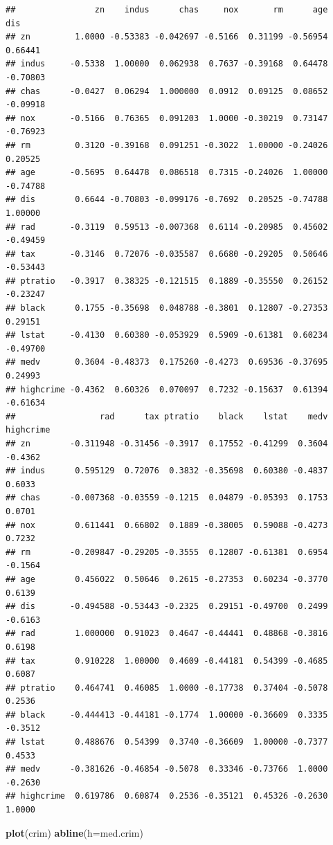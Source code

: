 \documentclass[
]{article}
\newenvironment{Shaded}{\begin{snugshade}}{\end{snugshade}}
\newcommand{\DataTypeTok}[1]{\textcolor[rgb]{0.13,0.29,0.53}{#1}}
\newcommand{\KeywordTok}[1]{\textcolor[rgb]{0.13,0.29,0.53}{\textbf{#1}}}
\newcommand{\NormalTok}[1]{#1}
\begin{document}
\begin{verbatim}
##                zn    indus      chas     nox       rm      age      dis
## zn         1.0000 -0.53383 -0.042697 -0.5166  0.31199 -0.56954  0.66441
## indus     -0.5338  1.00000  0.062938  0.7637 -0.39168  0.64478 -0.70803
## chas      -0.0427  0.06294  1.000000  0.0912  0.09125  0.08652 -0.09918
## nox       -0.5166  0.76365  0.091203  1.0000 -0.30219  0.73147 -0.76923
## rm         0.3120 -0.39168  0.091251 -0.3022  1.00000 -0.24026  0.20525
## age       -0.5695  0.64478  0.086518  0.7315 -0.24026  1.00000 -0.74788
## dis        0.6644 -0.70803 -0.099176 -0.7692  0.20525 -0.74788  1.00000
## rad       -0.3119  0.59513 -0.007368  0.6114 -0.20985  0.45602 -0.49459
## tax       -0.3146  0.72076 -0.035587  0.6680 -0.29205  0.50646 -0.53443
## ptratio   -0.3917  0.38325 -0.121515  0.1889 -0.35550  0.26152 -0.23247
## black      0.1755 -0.35698  0.048788 -0.3801  0.12807 -0.27353  0.29151
## lstat     -0.4130  0.60380 -0.053929  0.5909 -0.61381  0.60234 -0.49700
## medv       0.3604 -0.48373  0.175260 -0.4273  0.69536 -0.37695  0.24993
## highcrime -0.4362  0.60326  0.070097  0.7232 -0.15637  0.61394 -0.61634
##                 rad      tax ptratio    black    lstat    medv highcrime
## zn        -0.311948 -0.31456 -0.3917  0.17552 -0.41299  0.3604   -0.4362
## indus      0.595129  0.72076  0.3832 -0.35698  0.60380 -0.4837    0.6033
## chas      -0.007368 -0.03559 -0.1215  0.04879 -0.05393  0.1753    0.0701
## nox        0.611441  0.66802  0.1889 -0.38005  0.59088 -0.4273    0.7232
## rm        -0.209847 -0.29205 -0.3555  0.12807 -0.61381  0.6954   -0.1564
## age        0.456022  0.50646  0.2615 -0.27353  0.60234 -0.3770    0.6139
## dis       -0.494588 -0.53443 -0.2325  0.29151 -0.49700  0.2499   -0.6163
## rad        1.000000  0.91023  0.4647 -0.44441  0.48868 -0.3816    0.6198
## tax        0.910228  1.00000  0.4609 -0.44181  0.54399 -0.4685    0.6087
## ptratio    0.464741  0.46085  1.0000 -0.17738  0.37404 -0.5078    0.2536
## black     -0.444413 -0.44181 -0.1774  1.00000 -0.36609  0.3335   -0.3512
## lstat      0.488676  0.54399  0.3740 -0.36609  1.00000 -0.7377    0.4533
## medv      -0.381626 -0.46854 -0.5078  0.33346 -0.73766  1.0000   -0.2630
## highcrime  0.619786  0.60874  0.2536 -0.35121  0.45326 -0.2630    1.0000
\end{verbatim}

\begin{Shaded}
\begin{Highlighting}[]
\KeywordTok{plot}\NormalTok{(crim)}
\KeywordTok{abline}\NormalTok{(}\DataTypeTok{h=}\NormalTok{med.crim)}
\end{Highlighting}
\end{Shaded}
\end{document}
